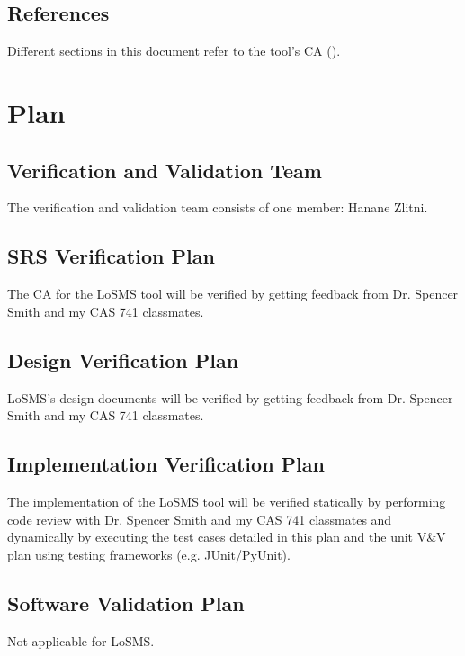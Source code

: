\documentclass[12pt, titlepage]{article}
\newcommand{\famname}{LoSMS} %
\begin{document}
\subsection{References}

Different sections in this document refer to the tool's CA (\cite{losms-ca}).

\section{Plan} \label{Plan}
	
\subsection{Verification and Validation Team}

The verification and validation team consists of one member: Hanane Zlitni.

\subsection{SRS Verification Plan}

The CA for the \famname{} tool will be verified by getting feedback from Dr. 
Spencer Smith and my CAS 741 classmates.

\subsection{Design Verification Plan}

\famname{}'s design documents will be verified by getting feedback from 
Dr. Spencer Smith and my CAS 741 classmates.

\subsection{Implementation Verification Plan}

The implementation of the \famname{} tool will be verified statically by 
performing code review with Dr. Spencer Smith and my CAS 741 classmates and 
dynamically by executing the test cases detailed in this plan and the unit V\&V 
plan using testing frameworks (e.g. JUnit/PyUnit).
 
\subsection{Software Validation Plan}

Not applicable for \famname{}.
\end{document}
